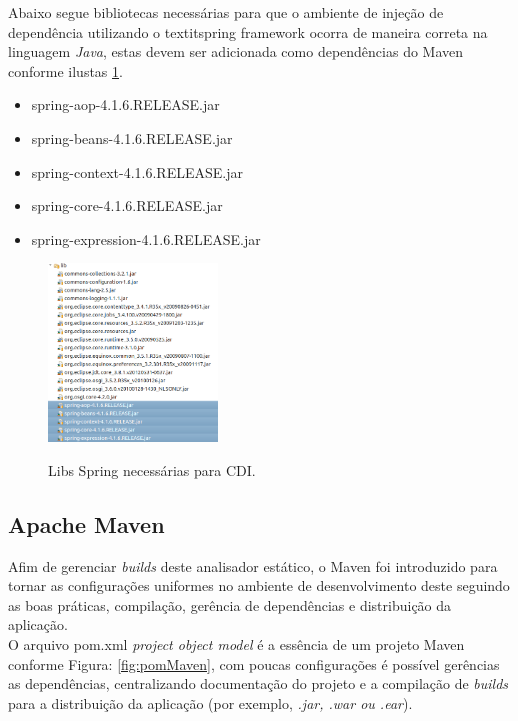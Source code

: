 Abaixo segue bibliotecas necessárias para que o ambiente de injeção de dependência utilizando o textit{spring framework} \cite{SPRING_REF} ocorra de maneira correta na linguagem \textit{Java}, estas devem ser adicionada como dependências do Maven conforme ilustas \ref{fig:libsCDI}.
\begin{itemize}
	\item spring-aop-4.1.6.RELEASE.jar
	\item spring-beans-4.1.6.RELEASE.jar
	\item spring-context-4.1.6.RELEASE.jar
	\item spring-core-4.1.6.RELEASE.jar
	\item spring-expression-4.1.6.RELEASE.jar
\end{itemize}
\clearpage

\begin{figure}[h]
	\center
	\includegraphics[width=0.4\textwidth]{Imagens/libsSpring}
	\label{fig:libsCDI}
	\caption{Libs Spring necessárias para CDI.}
\end{figure}



\clearpage
\subsection{Apache Maven}
Afim de gerenciar \textit{builds} deste analisador estático, o Maven foi introduzido para tornar as configurações uniformes no ambiente de desenvolvimento deste seguindo as boas práticas, compilação, gerência de dependências e distribuição da aplicação.\\

O arquivo pom.xml \textit{project object model} é a essência de um projeto Maven conforme Figura:  \ref{fig:pomMaven}, com poucas configurações é possível gerências as dependências, centralizando documentação do projeto e a compilação de \textit{builds} para a distribuição da aplicação (por exemplo, \textit{.jar, .war ou .ear}).\\


